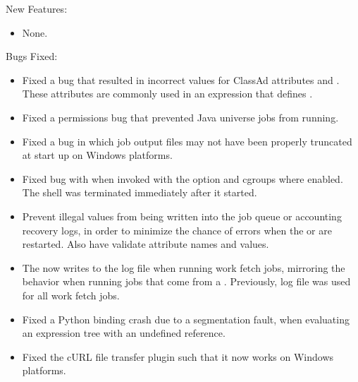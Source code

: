 \noindent New Features:

\begin{itemize}

\item None.

\end{itemize}

\noindent Bugs Fixed:

\begin{itemize}

\item Fixed a bug that resulted in incorrect values for ClassAd attributes
 and .
These attributes are commonly used in an expression that defines
.

\item Fixed a permissions bug that prevented Java universe jobs
from running.

\item Fixed a bug in which job output files may not have been properly truncated
at start up on Windows platforms. 

\item Fixed bug with  
when invoked with the  option and cgroups where enabled.
The shell was terminated immediately after it started.

\item Prevent illegal values from being written into the job queue
or accounting recovery logs, in order to minimize the chance of errors when
the  or  are restarted. Also
have  validate attribute names and values.

\item The  now writes to the log file
 when running work fetch jobs, mirroring the
behavior when running jobs that come from a .
Previously, log file  was used for all work fetch
jobs.

\item Fixed a Python binding crash due to a segmentation fault, when evaluating an expression tree with an undefined reference.

\item Fixed the cURL file transfer plugin such that it now works
on Windows platforms.


\end{itemize}
